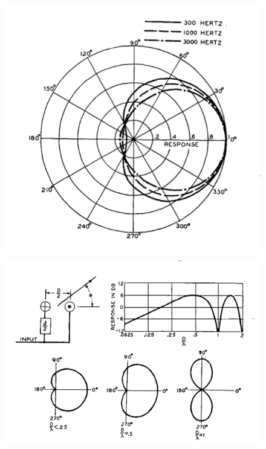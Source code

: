 \documentclass{report}
\begin{document}
        \begin{figure}[H]
            \centering
            \begin{minipage}{.4\textwidth}
                \includegraphics[width=\linewidth]{figs/olsonFirstOrderDirectivity.png}
                \caption{}\cite{olson1973gradient}
                \label{olsonFirstOrderDirectivity}
            \end{minipage}
            \begin{minipage}{.55\textwidth}
                \includegraphics[width=\linewidth]{figs/olsonFreqResponse.png}
                \caption{}\cite{olson1973gradient}
                \label{olsonFreqResponse}
            \end{minipage}
        \end{figure}
\end{document}
